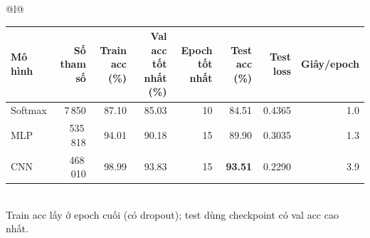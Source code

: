 \begin{tabular}{@{}l@{}}
\begin{tabular}{lrrrrrrr}
\toprule
Mô hình & Số tham số & Train acc (\%) & Val acc tốt nhất (\%) & Epoch tốt nhất & Test acc (\%) & Test loss & Giây/epoch \\
\midrule
Softmax & 7\,850 & 87.10 & 85.03 & 10 & 84.51 & 0.4365 & 1.0 \\
MLP & 535\,818 & 94.01 & 90.18 & 15 & 89.90 & 0.3035 & 1.3 \\
CNN & 468\,010 & 98.99 & 93.83 & 15 & \textbf{93.51} & 0.2290 & 3.9 \\
\bottomrule
\end{tabular}
\\[2pt]
{\footnotesize Train acc lấy ở epoch cuối (có dropout); test dùng checkpoint có val acc cao nhất.}
\end{tabular}
